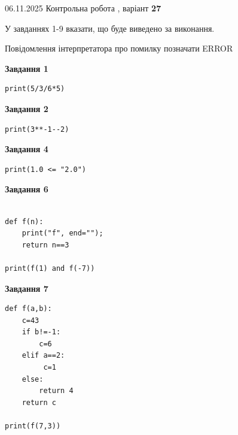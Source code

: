 \documentclass[12pt, ukrainian]{article}
\begin{document}
{\Large{06.11.2025 Контрольна робота , варіант  \No \textbf { 27 }\par}}
{
\begin {large}
У завданнях 1-9 вказати, що буде виведено за виконання.

Повідомлення інтерпретатора про помилку позначати ERROR

\begin{minipage}[t]{7.5cm}

\begin{center}
\textbf{Завдання 1}
\end{center}

\begin{verbatim}
print(5/3/6*5)
\end{verbatim}



\begin{center}
\textbf{Завдання 2}
\end{center}

\begin{verbatim}
print(3**-1--2)
\end{verbatim}



\begin{center}
\textbf{Завдання 4}
\end{center}

\begin{verbatim}
print(1.0 <= "2.0")
\end{verbatim}



\begin{center}
\textbf{Завдання 6}
\end{center}

\begin{verbatim}

def f(n):
    print("f", end="");
    return n==3

print(f(1) and f(-7))
\end{verbatim}



\begin{center}
\textbf{Завдання 7}
\end{center}

\begin{verbatim}
def f(a,b):
    c=43
    if b!=-1:
        c=6
    elif a==2:
         c=1
    else: 
        return 4
    return c

print(f(7,3))
\end{verbatim}


\end{minipage}
\end{large}}
\end{document}

